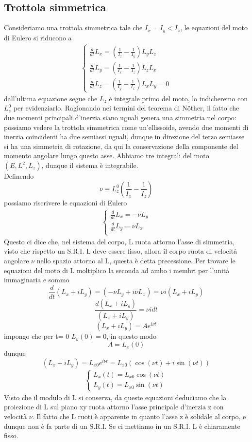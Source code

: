 \documentclass[
10pt, %
a4paper, %
oneside, %
headinclude,footinclude, %
BCOR5mm, %
]{scrartcl}
\begin{document}
\subsection{Trottola simmetrica}
Consideriamo una trottola simmetrica tale che \(I_x = I_y < I_z\), le equazioni del moto di Eulero si riducono a 
\begin{align*}
	\begin{cases}
		\frac{d}{dt}L_x =\left(\frac{1}{I_z}-\frac{1}{I_y}\right)L_yL_z\\
		\frac{d}{dt}L_y =\left(\frac{1}{I_x}-\frac{1}{I_z}\right)L_zL_x\\
		\frac{d}{dt}L_z =\left(\frac{1}{I_y}-\frac{1}{I_x}\right)L_xL_y = 0
	\end{cases}
\end{align*}
dall'ultima equazione segue che \(L_z\) è integrale primo del moto, lo indicheremo con \(L^0_z\) per evidenziarlo. Ragionando nei termini del teorema di N\"{o}ther, il fatto che due momenti principali d'inerzia siano uguali genera una simmetria nel corpo: possiamo vedere la trottola simmetrica come un'ellissoide, avendo due momenti di inerzia coincidenti ha due semiassi uguali, dunque in direzione del terzo semiasse si ha una simmetria di rotazione, da qui la conservazione della componente del momento angolare lungo questo asse. Abbiamo tre integrali del moto \((E, L^2, L_z)\), dunque il sistema è integrabile.\\
Definendo 
\[\nu \equiv L^0_z\left(\frac{1}{I_x}-\frac{1}{I_z}\right) \]
possiamo riscrivere le equazioni di Eulero 
\begin{align*}
	\begin{cases}
		\frac{d}{dt}L_x =-\nu L_y\\
		\frac{d}{dt}L_y =\nu L_x\\
	\end{cases}
\end{align*}
Questo ci dice che, nel sistema del corpo, L ruota attorno l'asse di simmetria, visto che rispetto un S.R.I. L deve essere fisso, allora il corpo ruota di velocità angolare $\nu$ nello spazio attorno al L, questa è detta precessione. Per trovare le equazioni del moto di L moltiplico la seconda ad ambo i membri per l'unità immaginaria e sommo
\[\frac{d}{dt}(L_x + iL_y) =(-\nu L_y+i\nu L_x) = \nu i ( L_x + iL_y)\]
\[\frac{d(L_x + iL_y)}{( L_x + iL_y)} =\nu i dt\]
\[(L_x + iL_y) = Ae^{i\nu t}\]
impongo che per t= 0 \(L_y(0) = 0\), in questo modo
\[A = L_x(0)\]
dunque
\[(L_x + iL_y) = L_{x0}e^{i\nu t} = L_{x0}(\cos(\nu t)+i\sin(\nu t))\]
\begin{align*}
	\begin{cases}
		L_x(t) = L_{x0}\cos(\nu t)\\
		L_y(t) = L_{x0}\sin(\nu t)
	\end{cases}
\end{align*}
Visto che il modulo di L si conserva, da queste equazioni deduciamo che la proiezione di L sul piano xy ruota attorno l'asse principale d'inerzia z con velocità \(\nu\). Il fatto che L ruoti è apparente in quanto l'asse z è solidale al corpo, e dunque non è fa parte di un S.R.I. Se ci mettiamo in un S.R.I. L è chiaramente fisso.
\end{document}

